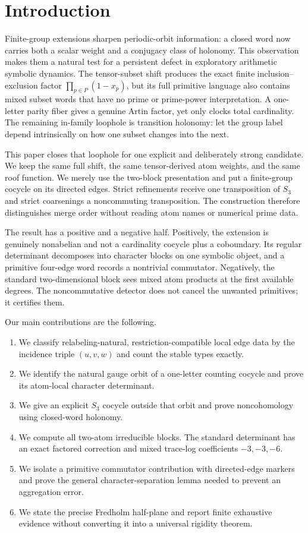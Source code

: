 \section{Introduction}
\label{sec:introduction}

Finite-group extensions sharpen periodic-orbit information: a closed word
now carries both a scalar weight and a conjugacy class of holonomy.  This
observation makes them a natural test for a persistent defect in exploratory
arithmetic symbolic dynamics.  The tensor-subset shift produces the exact
finite inclusion--exclusion factor
\(\prod_{p\in P}(1-x_p)\), but its full primitive language also contains
mixed subset words that have no prime or prime-power interpretation.  A
one-letter parity fiber gives a genuine Artin factor, yet only clocks total
cardinality.  The remaining in-family loophole is transition holonomy: let
the group label depend intrinsically on how one subset changes into the
next.

This paper closes that loophole for one explicit and deliberately strong
candidate.  We keep the same full shift, the same tensor-derived atom
weights, and the same roof function.  We merely use the two-block
presentation and put a finite-group cocycle on its directed edges.  Strict
refinements receive one transposition of $S_3$ and strict coarsenings a
noncommuting transposition.  The construction therefore distinguishes merge
order without reading atom names or numerical prime data.

The result has a positive and a negative half.  Positively, the extension is
genuinely nonabelian and not a cardinality cocycle plus a coboundary.  Its
regular determinant decomposes into character blocks on one symbolic
object, and a primitive four-edge word records a nontrivial commutator.
Negatively, the standard two-dimensional block sees mixed atom products at
the first available degrees.  The noncommutative detector does not cancel
the unwanted primitives; it certifies them.

Our main contributions are the following.

\begin{enumerate}
\item We classify relabeling-natural, restriction-compatible local edge
  data by the incidence triple $(u,v,w)$ and count the stable types exactly.
\item We identify the natural gauge orbit of a one-letter counting cocycle
  and prove its atom-local character determinant.
\item We give an explicit $S_3$ cocycle outside that orbit and prove
  noncohomology using closed-word holonomy.
\item We compute all two-atom irreducible blocks.  The standard determinant
  has an exact factored correction and mixed trace-log coefficients
  $-3,-3,-6$.
\item We isolate a primitive commutator contribution with directed-edge
  markers and prove the general character-separation lemma needed to prevent
  an aggregation error.
\item We state the precise Fredholm half-plane and report finite exhaustive
  evidence without converting it into a universal rigidity theorem.
\end{enumerate}

